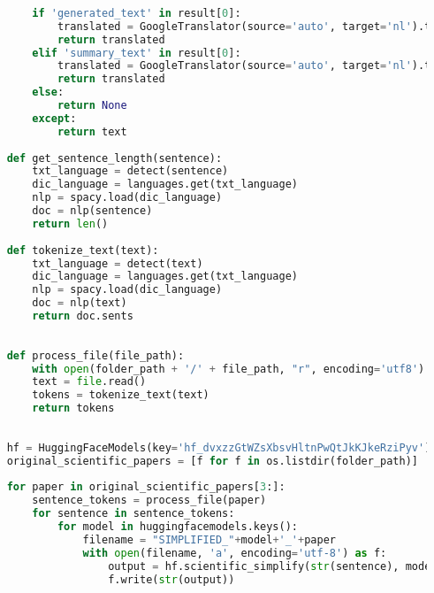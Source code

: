 \begin{center}
\begin{lstlisting}[language=Python, caption={Script voor de derde fase van de vergelijkende studie}, label={code:verg-studie-phase-3}]
		
		if 'generated_text' in result[0]:
			translated = GoogleTranslator(source='auto', target='nl').translate(str(result[0]['generated_text']))
			return translated
		elif 'summary_text' in result[0]:
			translated = GoogleTranslator(source='auto', target='nl').translate(str(result[0]['summary_text']))
			return translated
		else:
			return None
		except:
			return text
		
	def get_sentence_length(sentence):
		txt_language = detect(sentence)
		dic_language = languages.get(txt_language)
		nlp = spacy.load(dic_language)
		doc = nlp(sentence)
		return len()	
	
	def tokenize_text(text):
		txt_language = detect(text)
		dic_language = languages.get(txt_language)
		nlp = spacy.load(dic_language)
		doc = nlp(text)
		return doc.sents
		
	
	def process_file(file_path):
		with open(folder_path + '/' + file_path, "r", encoding='utf8') as file:
		text = file.read()
		tokens = tokenize_text(text)
		return tokens
		
	
	hf = HuggingFaceModels(key='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')
	original_scientific_papers = [f for f in os.listdir(folder_path)]
	
	for paper in original_scientific_papers[3:]:
		sentence_tokens = process_file(paper) 
		for sentence in sentence_tokens:
			for model in huggingfacemodels.keys():
				filename = "SIMPLIFIED_"+model+'_'+paper
				with open(filename, 'a', encoding='utf-8') as f:
					output = hf.scientific_simplify(str(sentence), model)
					f.write(str(output)) 	
	\end{lstlisting}
\end{center}

\newpage

